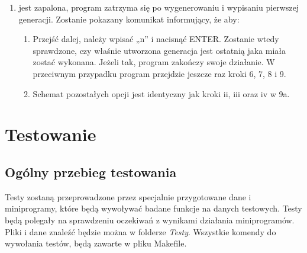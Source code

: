 \documentclass[12pt]{report}
\begin{document}
\begin{enumerate}
\begin{enumerate}
\begin{enumerate}
    \end{enumerate}
    \item jest zapalona, program zatrzyma się po wygenerowaniu i wypisaniu pierwszej generacji. Zostanie pokazany komunikat informujący, że aby:
    \begin{enumerate}
        \item Przejść dalej, należy wpisać „n” i nacisnąć ENTER. Zostanie wtedy sprawdzone, czy właśnie utworzona generacja jest ostatnią jaka miała zostać wykonana. Jeżeli tak, program zakończy swoje działanie. W przeciwnym przypadku program przejdzie jeszcze raz kroki 6, 7, 8 i 9.
        \item Schemat pozostałych opcji jest identyczny jak kroki ii, iii oraz iv w 9a.
    \end{enumerate}
\end{enumerate}
\end{enumerate}
\section{Testowanie}
\subsection{Ogólny przebieg testowania}
Testy zostaną przeprowadzone przez specjalnie przygotowane dane i miniprogramy, które będą wywoływać badane funkcje na danych testowych. Testy będą polegały na sprawdzeniu oczekiwań z wynikami działania miniprogramów. Pliki i dane znaleźć będzie można w folderze \textit{Testy}. Wszystkie komendy do wywołania testów, będą zawarte w pliku Makefile.
\end{document}

